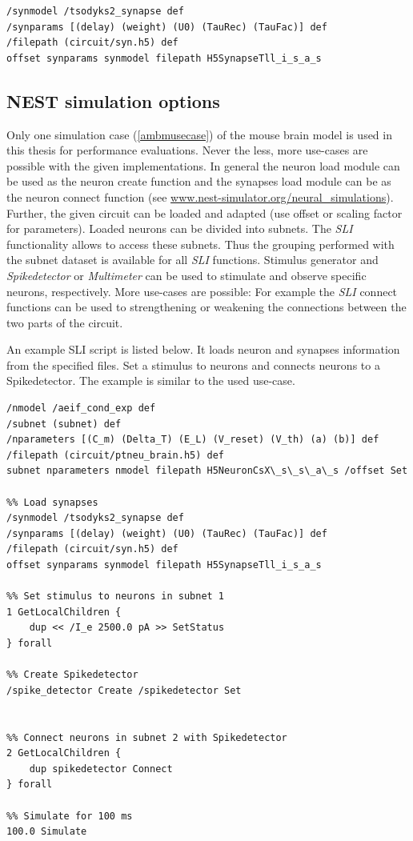 \begin{lstlisting}[label=sliSynapses,caption=Example importing synapses]
/synmodel /tsodyks2_synapse def
/synparams [(delay) (weight) (U0) (TauRec) (TauFac)] def
/filepath (circuit/syn.h5) def
offset synparams synmodel filepath H5SynapseTll_i_s_a_s
\end{lstlisting}

\subsection{NEST simulation options}

Only one simulation case (\ref{ambmusecase}) of the mouse brain model is used in this thesis for performance evaluations.
Never the less, more use-cases are possible with the given implementations.
In general the neuron load module can be used as the neuron create function
and the synapses load module can be as the neuron connect function (see \url{www.nest-simulator.org/neural_simulations}).
Further, the given circuit can be loaded and adapted (use offset or scaling factor for parameters).
Loaded neurons can be divided into subnets. 
The \emph{SLI} functionality allows to access these subnets.
Thus the grouping performed with the subnet dataset is available for all \emph{SLI} functions.
Stimulus generator and \emph{Spikedetector} or \emph{Multimeter} can be used to stimulate
and observe specific neurons, respectively.
More use-cases are possible: For example the \emph{SLI} connect functions can be used to strengthening or weakening the connections between the two
parts of the circuit.

An example SLI script is listed below.
It loads neuron and synapses information from the specified files.
Set a stimulus to neurons and connects neurons to a Spikedetector.
The example is similar to the used use-case.
\begin{lstlisting}[label=sliSynapses,caption=Example importing synapses]
%% Load neurons
/nmodel /aeif_cond_exp def
/subnet (subnet) def
/nparameters [(C_m) (Delta_T) (E_L) (V_reset) (V_th) (a) (b)] def
/filepath (circuit/ptneu_brain.h5) def
subnet nparameters nmodel filepath H5NeuronCsX\_s\_s\_a\_s /offset Set

%% Load synapses
/synmodel /tsodyks2_synapse def
/synparams [(delay) (weight) (U0) (TauRec) (TauFac)] def
/filepath (circuit/syn.h5) def
offset synparams synmodel filepath H5SynapseTll_i_s_a_s

%% Set stimulus to neurons in subnet 1
1 GetLocalChildren { 
    dup << /I_e 2500.0 pA >> SetStatus
} forall

%% Create Spikedetector
/spike_detector Create /spikedetector Set


%% Connect neurons in subnet 2 with Spikedetector
2 GetLocalChildren { 
    dup spikedetector Connect
} forall

%% Simulate for 100 ms
100.0 Simulate
\end{lstlisting}


